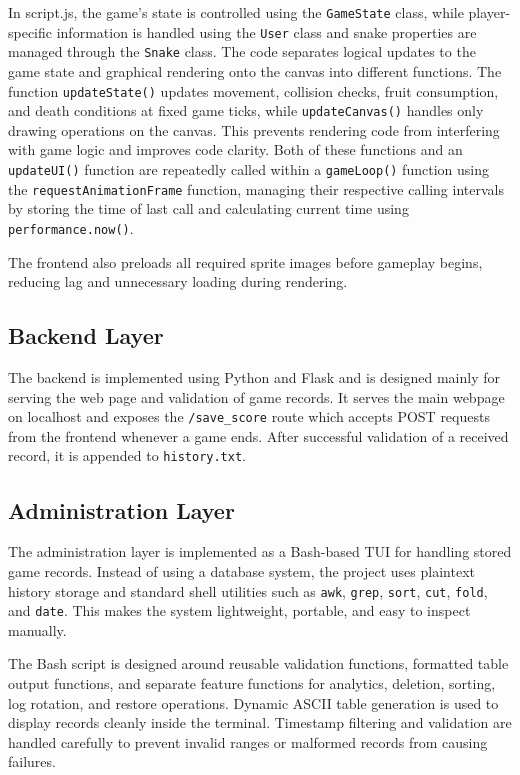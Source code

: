 \documentclass[12pt]{article}
\begin{document}
In script.js, the game's state is controlled using the \texttt{GameState} class, while player-specific information is handled using the \texttt{User} class and snake properties are managed through the \texttt{Snake} class. The code separates logical updates to the game state and graphical rendering onto the canvas into different functions. The function \texttt{updateState()} updates movement, collision checks, fruit consumption, and death conditions at fixed game ticks, while \texttt{updateCanvas()} handles only drawing operations on the canvas. This prevents rendering code from interfering with game logic and improves code clarity. Both of these functions and an \texttt{updateUI()} function are repeatedly called within a \texttt{gameLoop()} function using the \texttt{requestAnimationFrame} function, managing their respective calling intervals by storing the time of last call and calculating current time using \texttt{performance.now()}.

The frontend also preloads all required sprite images before gameplay begins, reducing lag and unnecessary loading during rendering.

\subsection{Backend Layer}

The backend is implemented using Python and Flask and is designed mainly for serving the web page and validation of game records. It serves the main webpage on localhost and exposes the \texttt{/save\_score} route which accepts POST requests from the frontend whenever a game ends. After successful validation of a received record, it is appended to \texttt{history.txt}.

\subsection{Administration Layer}
The administration layer is implemented as a Bash-based TUI for handling stored game records. Instead of using a database system, the project uses plaintext history storage and standard shell utilities such as \texttt{awk}, \texttt{grep}, \texttt{sort}, \texttt{cut}, \texttt{fold}, and \texttt{date}. This makes the system lightweight, portable, and easy to inspect manually.

The Bash script is designed around reusable validation functions, formatted table output functions, and separate feature functions for analytics, deletion, sorting, log rotation, and restore operations. Dynamic ASCII table generation is used to display records cleanly inside the terminal. Timestamp filtering and validation are handled carefully to prevent invalid ranges or malformed records from causing failures.
\end{document}
